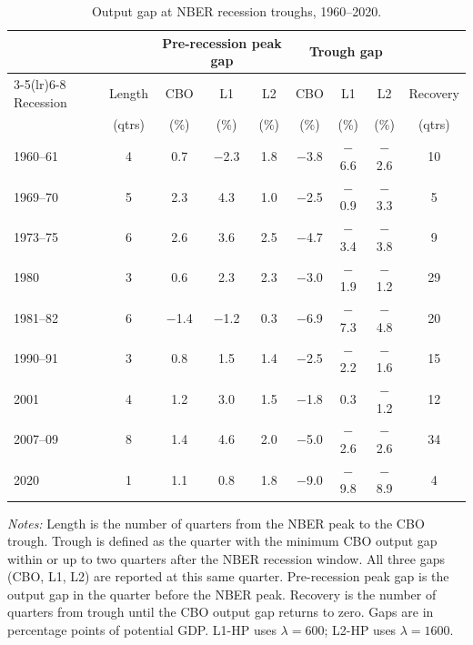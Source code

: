 \documentclass[10pt]{article}
\begin{document}
\begin{table}[htbp]
\centering
\caption{Output gap at NBER recession troughs, 1960--2020.}
\label{tab:recession_troughs}
\small
\begin{tabular}{lc ccc ccc c}
\toprule
 & & \multicolumn{3}{c}{Pre-recession peak gap} & \multicolumn{3}{c}{Trough gap} & \\
\cmidrule(lr){3-5}\cmidrule(lr){6-8}
Recession & Length & CBO & L1 & L2 & CBO & L1 & L2 & Recovery \\
 & (qtrs) & (\%) & (\%) & (\%) & (\%) & (\%) & (\%) & (qtrs) \\
\midrule
1960--61   & 4  &  0.7 & $-$2.3 &  1.8 & $-$3.8 & $-$6.6 & $-$2.6 & 10 \\
1969--70   & 5  &  2.3 &   4.3  &  1.0 & $-$2.5 & $-$0.9 & $-$3.3 &  5 \\
1973--75   & 6  &  2.6 &   3.6  &  2.5 & $-$4.7 & $-$3.4 & $-$3.8 &  9 \\
1980       & 3  &  0.6 &   2.3  &  2.3 & $-$3.0 & $-$1.9 & $-$1.2 & 29 \\
1981--82   & 6  & $-$1.4 & $-$1.2  &  0.3 & $-$6.9 & $-$7.3 & $-$4.8 & 20 \\
1990--91   & 3  &  0.8 &   1.5  &  1.4 & $-$2.5 & $-$2.2 & $-$1.6 & 15 \\
2001       & 4  &  1.2 &   3.0  &  1.5 & $-$1.8 &   0.3  & $-$1.2 & 12 \\
2007--09   & 8  &  1.4 &   4.6  &  2.0 & $-$5.0 & $-$2.6 & $-$2.6 & 34 \\
2020       & 1  &  1.1 &   0.8  &  1.8 & $-$9.0 & $-$9.8 & $-$8.9 &  4 \\
\bottomrule
\end{tabular}
\begin{tablenotes}
\small
\item \textit{Notes:} Length is the number of quarters from the NBER peak to the CBO trough. Trough is defined as the quarter with the minimum CBO output gap within or up to two quarters after the NBER recession window. All three gaps (CBO, L1, L2) are reported at this same quarter. Pre-recession peak gap is the output gap in the quarter before the NBER peak. Recovery is the number of quarters from trough until the CBO output gap returns to zero. Gaps are in percentage points of potential GDP. L1-HP uses $\lambda=600$; L2-HP uses $\lambda=1600$.
\end{tablenotes}
\end{table}
\end{document}
